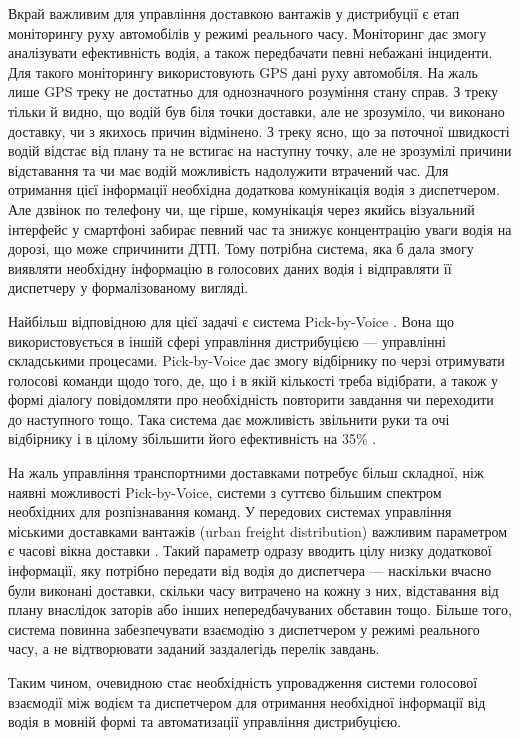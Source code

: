 Вкрай важливим для управління доставкою вантажів у дистрибуції є етап моніторингу руху автомобілів у режимі реального часу. Моніторинг дає змогу аналізувати ефективність водія, а також передбачати певні небажані інциденти. Для такого моніторингу використовують GPS дані руху автомобіля\cite{Gonzalez_2013,Comendador_2012}. На жаль лише GPS треку не достатньо для однозначного розуміння стану справ. З треку тільки й видно, що водій був біля точки доставки, але не зрозуміло, чи виконано доставку, чи з якихось причин відмінено. З треку ясно, що за поточної швидкості водій відстає від плану та не встигає на наступну точку, але не зрозумілі причини відставання та чи має водій можливість надолужити втрачений час. Для отримання цієї інформації необхідна додаткова комунікація водія з диспетчером. Але дзвінок по телефону чи, ще гірше, комунікація через якийсь візуальний інтерфейс у смартфоні забирає певний час та знижує концентрацію уваги водія на дорозі, що може спричинити ДТП. Тому потрібна система, яка б дала змогу виявляти необхідну інформацію в голосових даних водія і відправляти її диспетчеру у формалізованому вигляді.

Найбільш відповідною для цієї задачі є  система Pick-by-Voice \cite{Pick-to-Voice}. Вона що використовується в іншій сфері управління дистрибуцією — управлінні складськими процесами. Pick-by-Voice дає змогу відбірнику по черзі отримувати голосові команди щодо того, де, що і в якій кількості треба відібрати, а також у формі діалогу повідомляти про необхідність повторити завдання чи переходити до наступного тощо. Така система дає можливість звільнити руки та очі відбірнику і в цілому збільшити його ефективність на 35\% \cite{Baumann_2012}.

На жаль управління транспортними доставками потребує більш складної, ніж наявні можливості Pick-by-Voice, системи з суттєво більшим спектром необхідних для розпізнавання команд. У передових системах управління міськими доставками вантажів (urban freight distribution) важливим параметром є часові вікна доставки \cite{Quak_2006}. Такий параметр одразу вводить цілу низку додаткової інформації, яку потрібно передати від водія до диспетчера — наскільки вчасно були виконані доставки, скільки часу витрачено на кожну з них, відставання від плану внаслідок заторів або інших непередбачуваних обставин тощо. Більше того, система повинна забезпечувати взаємодію з диспетчером у режимі реального часу, а не відтворювати заданий заздалегідь перелік завдань.

Таким чином, очевидною стає необхідність упровадження системи голосової взаємодії між водієм та диспетчером для отримання необхідної інформації від водія в мовній формі та автоматизації управління дистрибуцією.

